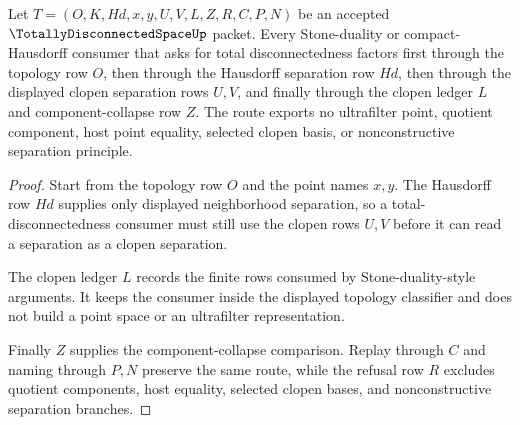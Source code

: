 \begin{theorem}
\label{thm:totally-disconnected-space-clopen-separation-route}
Let $T=(O,K,Hd,x,y,U,V,L,Z,R,C,P,N)$ be an accepted $\TotallyDisconnectedSpaceUp$ packet. Every Stone-duality or compact-Hausdorff consumer that asks for total disconnectedness factors first through the topology row $O$, then through the Hausdorff separation row $Hd$, then through the displayed clopen separation rows $U,V$, and finally through the clopen ledger $L$ and component-collapse row $Z$. The route exports no ultrafilter point, quotient component, host point equality, selected clopen basis, or nonconstructive separation principle.
\end{theorem}
\begin{proof}
Start from the topology row $O$ and the point names $x,y$. The Hausdorff row $Hd$ supplies only displayed neighborhood separation, so a total-disconnectedness consumer must still use the clopen rows $U,V$ before it can read a separation as a clopen separation.

The clopen ledger $L$ records the finite rows consumed by Stone-duality-style arguments. It keeps the consumer inside the displayed topology classifier and does not build a point space or an ultrafilter representation.

Finally $Z$ supplies the component-collapse comparison. Replay through $C$ and naming through $P,N$ preserve the same route, while the refusal row $R$ excludes quotient components, host equality, selected clopen bases, and nonconstructive separation branches.
\end{proof}


\begin{closurestatus}{\TotallyDisconnectedSpaceUp}
  \theoryclosure{\seedClosure}
  \formalstatus{\unformalizedV}
\end{closurestatus}
